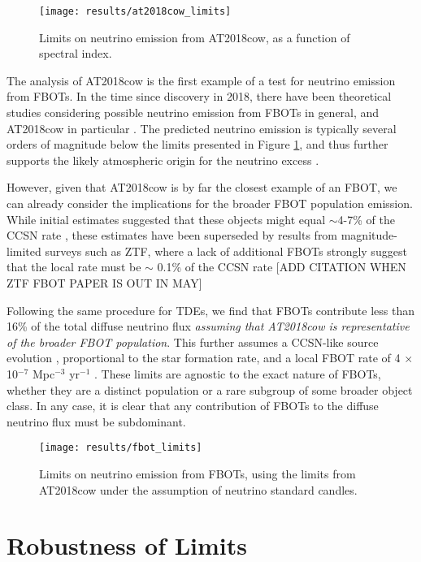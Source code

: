 \begin{figure}[!ht]
	\centering \texttt{[image: results/at2018cow\_limits]}
	\caption{Limits on neutrino emission from AT2018cow, as a function of spectral index.}
	\label{fig:at2018cow_limits}
\end{figure}

The analysis of AT2018cow is the first example of a test for neutrino emission from FBOTs. In the time since discovery in 2018, there have been theoretical studies considering possible neutrino emission from FBOTs in general, and AT2018cow in particular . The predicted neutrino emission is typically several orders of magnitude below the limits presented in Figure \ref{fig:at2018cow_limits}, and thus further supports the likely atmospheric origin for the neutrino excess \cite{2018ATel11785....1B}.

However, given that AT2018cow is by far the closest example of an FBOT, we can already consider the implications for the broader FBOT population emission. While initial estimates suggested that these objects might equal $\sim$4-7\% of the CCSN rate \cite{drout_fbot, fang_fbot}, these estimates have been superseded by results from magnitude-limited surveys such as ZTF, where a lack of additional FBOTs strongly suggest that the local rate must be $\sim$ 0.1\% of the CCSN rate [ADD CITATION WHEN ZTF FBOT PAPER IS OUT IN MAY] 

Following the same procedure for TDEs, we find that FBOTs contribute less than 16\% of the total diffuse neutrino flux \emph{assuming that AT2018cow is representative of the broader FBOT population}. This further assumes a CCSN-like source evolution , proportional to the star formation rate, and a local FBOT rate of 4 $\times$ 10$^{-7}$ Mpc$^{-3}$ yr$^{-1}$ \cite{ho_koala}. These limits are agnostic to the exact nature of FBOTs, whether they are a distinct population or a rare subgroup of some broader object class. In any case, it is clear  that any contribution of FBOTs to the diffuse neutrino flux must be subdominant.

\begin{figure}[!ht]
	\centering \texttt{[image: results/fbot\_limits]}
	\caption{Limits on neutrino emission from FBOTs, using the limits from AT2018cow under the assumption of neutrino standard candles.}
	\label{fig:fbot_limits}
\end{figure}

\section{Robustness of Limits}

